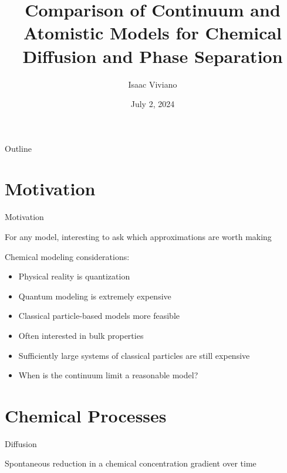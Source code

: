 \documentclass[professionalfont]{beamer}
\title{Comparison of Continuum and Atomistic Models for Chemical Diffusion and Phase Separation}
\date{July 2, 2024}
\author{Isaac Viviano}
\theoremstyle{remark}
\begin{document}
\begin{frame}

	\maketitle

\end{frame}

\begin{frame}{Outline}
	
	\tableofcontents

\end{frame}

\section{Motivation}

\begin{frame}{Motivation}
	
	For any model, interesting to ask which approximations are worth making

	\vspace{10 pt}

	Chemical modeling considerations:
	\begin{itemize}
		\item Physical reality is quantization
		\item Quantum modeling is extremely expensive
		\item Classical particle-based models more feasible
		\item Often interested in bulk properties
		\item Sufficiently large systems of classical particles are still expensive
		\item When is the continuum limit a reasonable model?
	\end{itemize}

	
\end{frame}

\section{Chemical Processes}

\begin{frame}{Diffusion} %

	Spontaneous reduction in a chemical concentration gradient over time

	\begin{figure} %
		\centering 
		\qquad
	\end{figure} 
	
\end{frame}
\end{document}
